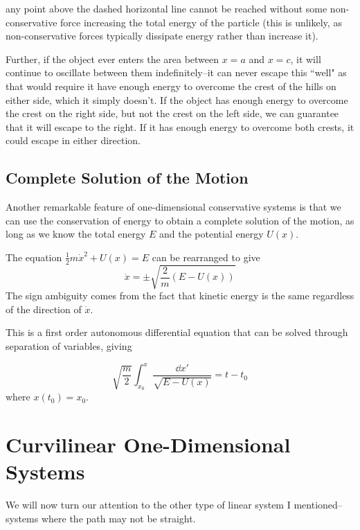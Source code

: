 any point above the dashed horizontal line cannot be reached without some non-conservative force increasing the total energy of the particle (this is unlikely, as non-conservative forces typically dissipate energy rather than increase it).

Further, if the object ever enters the area between $x=a$ and $x=c$, it will continue to oscillate between them indefinitely--it can never escape this ``well" as that would require it have enough energy to overcome the crest of the hills on either side, which it simply doesn't. If the object has enough energy to overcome the crest on the right side, but not the crest on the left side, we can guarantee that it will escape to the right. If it has enough energy to overcome both crests, it could escape in either direction.
\subsection*{Complete Solution of the Motion}
Another remarkable feature of one-dimensional conservative systems is that we can use the conservation of energy to obtain a complete solution of the motion, as long as we know the total energy $E$ and the potential energy $U(x)$.

The equation $\frac{1}{2}m\dot{x}^2 + U(x) = E$ can be rearranged to give
\[ \dot x = \pm \sqrt{\frac{2}{m}(E-U(x))}\]
The sign ambiguity comes from the fact that kinetic energy is the same regardless of the direction of $\dot x$. 

This is a first order autonomous differential equation that can be solved through separation of variables, giving

\[ \sqrt{\frac{m}{2}}\int_{x_0}^x \frac{\dd x'}{\sqrt{E-U(x)}} = t - t_0\]
where $x(t_0) = x_0$.
\section{Curvilinear One-Dimensional Systems}
We will now turn our attention to the other type of linear system I mentioned--systems where the path may not be straight.

